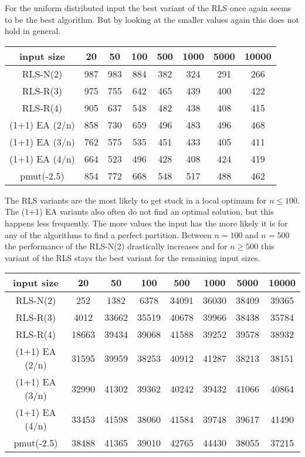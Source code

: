 For the uniform distributed input the best variant of the RLS once again seems to be the best algorithm.
But by looking at the smaller values again this does not hold in general.

\begin{tabular}[h]{cccccccc}
      input size    & 20  & 50  & 100 & 500 & 1000 & 5000 & 10000 \\\hline
      RLS-N(2)      & 987 & 983 & 884 & 382 & 324  & 291  & 266   \\
      RLS-R(3)      & 975 & 755 & 642 & 465 & 439  & 400  & 422   \\
      RLS-R(4)      & 905 & 637 & 548 & 482 & 438  & 408  & 415   \\
      (1+1) EA (2/n) & 858 & 730 & 659 & 496 & 483  & 496  & 468   \\
      (1+1) EA (3/n) & 762 & 575 & 535 & 451 & 433  & 405  & 411   \\
      (1+1) EA (4/n) & 664 & 523 & 496 & 428 & 408  & 424  & 419   \\
      pmut(-2.5)    & 854 & 772 & 668 & 548 & 517  & 488  & 462   \\
\end{tabular}

The RLS variants are the most likely to get stuck in a local optimum for $n\le100$. The (1+1) EA variants also often do not find an optimal solution, but this happens less frequently. The more values the input has the more likely it is for any of the algorithms to find a perfect partition. Between $n=100$ and $n=500$ the performance of the RLS-N(2) drastically increases and for $n\ge500$ this variant of the RLS stays the best variant for the remaining input sizes.

\begin{tabular}[h]{cccccccc}
      input size    & 20    & 50    & 100   & 500   & 1000  & 5000  & 10000 \\\hline
      RLS-N(2)      & 252   & 1382  & 6378  & 34091 & 36030 & 38409 & 39365 \\
      RLS-R(3)      & 4012  & 33662 & 35519 & 40678 & 39966 & 38438 & 35784 \\
      RLS-R(4)      & 18663 & 39434 & 39068 & 41588 & 39252 & 39578 & 38932 \\
      (1+1) EA (2/n) & 31595 & 39959 & 38253 & 40912 & 41287 & 38213 & 38151 \\
      (1+1) EA (3/n) & 32990 & 41302 & 39362 & 40242 & 39432 & 41066 & 40864 \\
      (1+1) EA (4/n) & 33453 & 41598 & 38060 & 41584 & 39748 & 39617 & 41490 \\
      pmut(-2.5)    & 38488 & 41365 & 39010 & 42765 & 44430 & 38055 & 37215 \\
\end{tabular}

